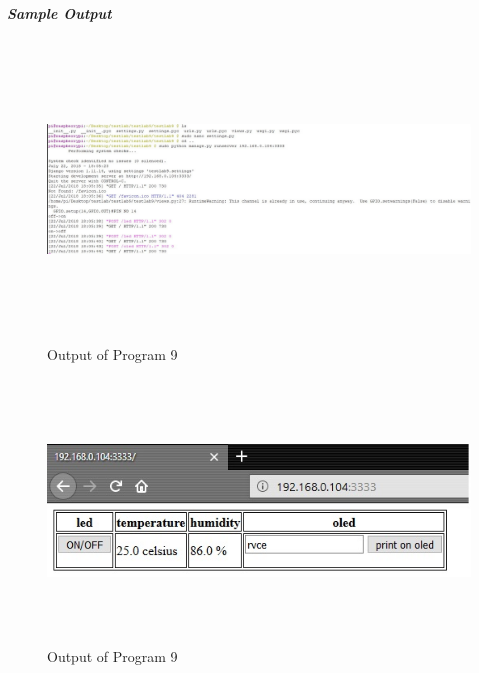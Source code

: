 \documentclass[12pt,a4paper]{article}
\begin{document}
\begin{flushleft}
\textbf{\textit{Sample Output}} \\
\begin{figure}[h!]
    \centering
	\includegraphics[width=17cm, height=8cm]{Lab9_1.jpg}
	\caption{Output of Program 9}
\end{figure}
\begin{figure}[h!]
    \centering
	\includegraphics[width=12cm, height=7cm]{Lab9_2.jpg}
	\caption{Output of Program 9}
\end{figure}
\end{flushleft}\vspace{3cm}
\end{document}
